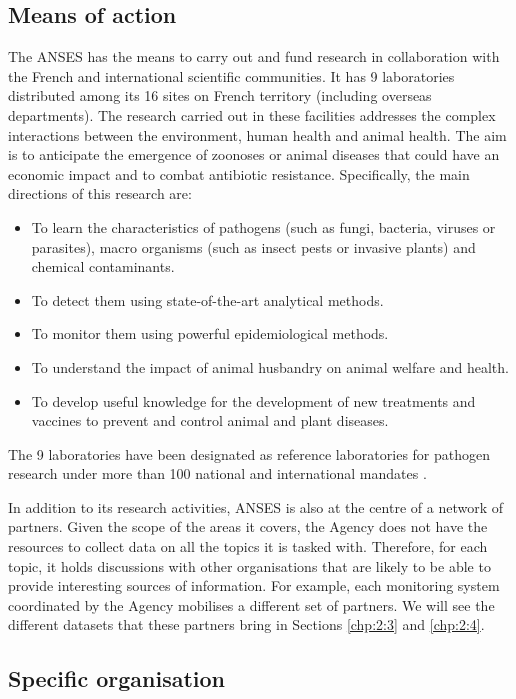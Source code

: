 \subsection{Means of action}

The ANSES has the means to carry out and fund research in collaboration with the French and international scientific communities. It has 9 laboratories distributed among its 16 sites on French territory (including overseas departments). The research carried out in these facilities addresses the complex interactions between the environment, human health and animal health. The aim is to anticipate the emergence of zoonoses or animal diseases that could have an economic impact and to combat antibiotic resistance. Specifically, the main directions of this research are:
\begin{itemize}
\item To learn the characteristics of pathogens (such as fungi, bacteria, viruses or parasites), macro organisms (such as insect pests or invasive plants) and chemical contaminants. 
\item To detect them using state-of-the-art analytical methods.
\item To monitor them using powerful epidemiological methods.
\item To understand the impact of animal husbandry on animal welfare and health.
\item To develop useful knowledge for the development of new treatments and vaccines to prevent and control animal and plant diseases. 
\end{itemize} 
The 9 laboratories have been designated as reference laboratories for pathogen research under more than 100 national and international mandates \citep{ANSESLABS}.

In addition to its research activities, ANSES is also at the centre of a network of partners. Given the scope of the areas it covers, the Agency does not have the resources to collect data on all the topics it is tasked with. Therefore, for each topic, it holds discussions with other organisations that are likely to be able to provide interesting sources of information. For example, each monitoring system coordinated by the Agency mobilises a different set of partners. We will see the different datasets that these partners bring in Sections \ref{chp:2:3} and \ref{chp:2:4}.

\subsection{Specific organisation}

